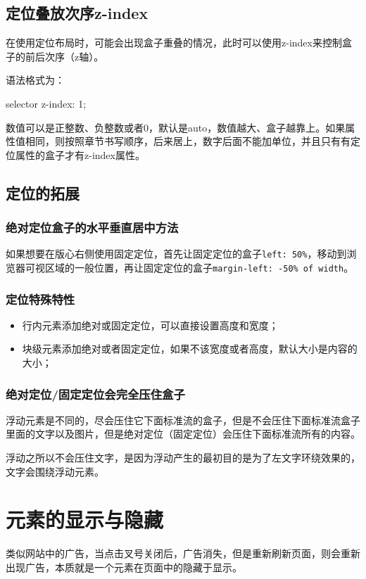 \subsection{定位叠放次序z-index}
在使用定位布局时，可能会出现盒子重叠的情况，此时可以使用z-index来控制盒子的前后次序（z轴）。

语法格式为：
\begin{css}
	selector {
	z-index: 1;
	}
\end{css}

数值可以是正整数、负整数或者0，默认是auto，数值越大、盒子越靠上。如果属性值相同，则按照章节书写顺序，后来居上，数字后面不能加单位，并且只有有定位属性的盒子才有z-index属性。
\subsection{定位的拓展}
\subsubsection{绝对定位盒子的水平垂直居中方法}
如果想要在版心右侧使用固定定位，首先让固定定位的盒子\verb|left: 50%|，移动到浏览器可视区域的一般位置，再让固定定位的盒子\verb|margin-left: -50% of width|。

\subsubsection{定位特殊特性}
\begin{itemize}
	\item 行内元素添加绝对或固定定位，可以直接设置高度和宽度；
	\item 块级元素添加绝对或者固定定位，如果不该宽度或者高度，默认大小是内容的大小；
\end{itemize}
\subsubsection{绝对定位/固定定位会完全压住盒子}
浮动元素是不同的，尽会压住它下面标准流的盒子，但是不会压住下面标准流盒子里面的文字以及图片，但是绝对定位（固定定位）会压住下面标准流所有的内容。

浮动之所以不会压住文字，是因为浮动产生的最初目的是为了左文字环绕效果的，文字会围绕浮动元素。

\section{元素的显示与隐藏}
类似网站中的广告，当点击叉号关闭后，广告消失，但是重新刷新页面，则会重新出现广告，本质就是一个元素在页面中的隐藏于显示。
